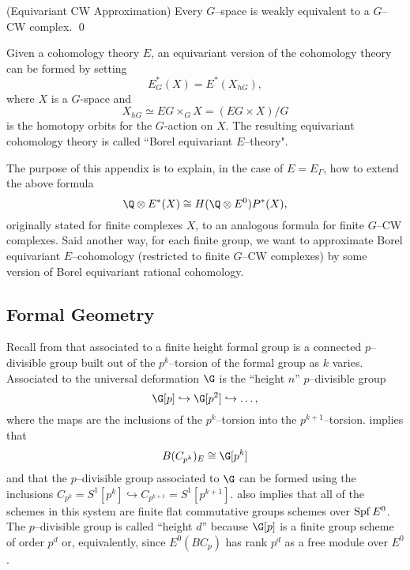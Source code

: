 \begin{theorem} \label{app:CWapprox} (Equivariant CW Approximation)
Every $G$--space is weakly equivalent to a $G$--CW complex. \qed
\end{theorem}

Given a cohomology theory $E$, an equivariant version of the cohomology theory can be formed by setting
\[
E^{*}_{G}(X) = E^*(X_{hG}),
\]
where $X$ is a $G$-space and
\[
X_{hG} \simeq EG \times_G X = (EG \times X)/G
\]
is the homotopy orbits for the $G$-action on $X$. The resulting equivariant cohomology theory is called ``Borel equivariant $E$--theory".

The purpose of this appendix is to explain, in the case of $E = E_{\Gamma}$, how to extend the above formula \[\Q \otimes E^*(X) \cong H(\Q \otimes E^0)P^*(X),\] originally stated for finite complexes $X$, to an analogous formula for finite $G$--CW complexes. Said another way, for each finite group, we want to approximate Borel equivariant $E$--cohomology (restricted to finite $G$--CW complexes) by some version of Borel equivariant rational cohomology.

\subsection*{Formal Geometry}


Recall from  that associated to a finite height formal group is a connected $p$--divisible group built out of the $p^k$--torsion of the formal group as $k$ varies. Associated to the universal deformation $\G$ is the ``height $n$'' $p$--divisible group
\[
\G[p] \hookrightarrow \G[p^2] \hookrightarrow \ldots,
\]
where the maps are the inclusions of the $p^k$--torsion into the $p^{k+1}$--torsion.   implies that 
\[
B(C_{p^k})_{E} \cong \G[p^k]
\]
and that the $p$--divisible group associated to $\G$ can be formed using the inclusions $C_{p^k} = S^1[p^k] \hookrightarrow C_{p^{k+1}} = S^1[p^{k+1}]$. 
 also implies that all of the schemes in this system are finite flat commutative groups schemes over $\operatorname{Spf} E^0$. The $p$--divisible group is called ``height $d$'' because $\G[p]$ is a finite group scheme of order $p^d$ or, equivalently, since $E^0(BC_p)$ has rank $p^d$ as a free module over $E^0$.

